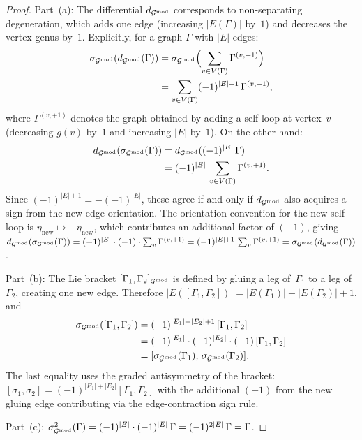 \begin{proof}
Part~(a): The differential $d_{\mathcal{G}^{\mathrm{mod}}}$ corresponds to
non-separating degeneration, which adds one edge (increasing
$|E(\Gamma)|$ by~$1$) and decreases the vertex genus by~$1$.
Explicitly, for a graph $\Gamma$ with $|E|$ edges:
\begin{align*}
\sigma_{\mathcal{G}^{\mathrm{mod}}}(d_{\mathcal{G}^{\mathrm{mod}}}(\Gamma))
&= \sigma_{\mathcal{G}^{\mathrm{mod}}}\Bigl(\sum_{v \in V(\Gamma)} \Gamma^{(v,+1)}\Bigr) \\
&= \sum_{v \in V(\Gamma)} (-1)^{|E|+1}\,\Gamma^{(v,+1)},
\end{align*}
where $\Gamma^{(v,+1)}$ denotes the graph obtained by adding a self-loop
at vertex~$v$ (decreasing $g(v)$ by~$1$ and increasing $|E|$ by~$1$).
On the other hand:
\begin{align*}
d_{\mathcal{G}^{\mathrm{mod}}}(\sigma_{\mathcal{G}^{\mathrm{mod}}}(\Gamma))
&= d_{\mathcal{G}^{\mathrm{mod}}}((-1)^{|E|}\,\Gamma) \\
&= (-1)^{|E|}\,\sum_{v \in V(\Gamma)} \Gamma^{(v,+1)}.
\end{align*}
Since $(-1)^{|E|+1} = -(-1)^{|E|}$, these agree if and only if
$d_{\mathcal{G}^{\mathrm{mod}}}$ also acquires a sign from the new edge orientation.
The orientation convention for the new self-loop is
$\eta_{\text{new}} \mapsto -\eta_{\text{new}}$, which contributes an
additional factor of $(-1)$, giving
$d_{\mathcal{G}^{\mathrm{mod}}}(\sigma_{\mathcal{G}^{\mathrm{mod}}}(\Gamma))
= (-1)^{|E|} \cdot (-1) \cdot \sum_v \Gamma^{(v,+1)}
= (-1)^{|E|+1}\,\sum_v \Gamma^{(v,+1)}
= \sigma_{\mathcal{G}^{\mathrm{mod}}}(d_{\mathcal{G}^{\mathrm{mod}}}(\Gamma))$.

Part~(b): The Lie bracket $[\Gamma_1, \Gamma_2]_{\mathcal{G}^{\mathrm{mod}}}$ is
defined by gluing a leg of~$\Gamma_1$ to a leg of~$\Gamma_2$,
creating one new edge. Therefore
$|E([\Gamma_1, \Gamma_2])| = |E(\Gamma_1)| + |E(\Gamma_2)| + 1$,
and
\begin{align*}
\sigma_{\mathcal{G}^{\mathrm{mod}}}([\Gamma_1, \Gamma_2])
&= (-1)^{|E_1|+|E_2|+1}\,[\Gamma_1, \Gamma_2] \\
&= (-1)^{|E_1|} \cdot (-1)^{|E_2|} \cdot (-1)\,[\Gamma_1, \Gamma_2] \\
&= [\sigma_{\mathcal{G}^{\mathrm{mod}}}(\Gamma_1),\, \sigma_{\mathcal{G}^{\mathrm{mod}}}(\Gamma_2)].
\end{align*}
The last equality uses the graded antisymmetry of the bracket:
$[\sigma_1, \sigma_2] = (-1)^{|E_1|+|E_2|}[\Gamma_1, \Gamma_2]$
with the additional $(-1)$ from the new gluing edge contributing via the
edge-contraction sign rule.

Part~(c): $\sigma_{\mathcal{G}^{\mathrm{mod}}}^2(\Gamma) = (-1)^{|E|} \cdot (-1)^{|E|}\,\Gamma
= (-1)^{2|E|}\,\Gamma = \Gamma$.
\end{proof}

